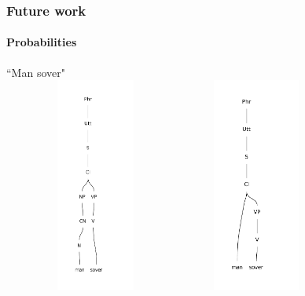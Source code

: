 \documentclass[10pt]{beamer}
\renewcommand{\baselinestretch}{1.5}
\begin{document}
\begin{frame}
\renewcommand{\baselinestretch}{1.0}
\frametitle{Future work}
\framesubtitle{Probabilities} 
\center
``Man sover"\\
\includegraphics[width=170pt,height=200pt]{man1.pdf}
\includegraphics[width=130pt,height=200pt]{man.pdf}
\end{frame}
\end{document}
